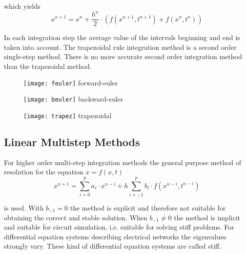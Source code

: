 which yields
\begin{equation}
\label{eq:TRInt}
x^{n+1} = x^n + \dfrac{h^n}{2}\cdot \left(f(x^{n+1}, t^{n+1}) + f(x^{n}, t^{n})\right)
\end{equation}

In each integration step the average value of the intervals beginning
and end is taken into account.  The trapezoidal rule integration
method is a second order single-step method.  There is no more
accurate second order integration method than the trapezoidal method.

\begin{center}
\begin{figure}[ht]
\begin{minipage}[t]{0.33\linewidth}
\centering
\texttt{[image: feuler]}
forward-euler
\end{minipage}
\begin{minipage}[t]{0.33\linewidth}
\centering
\texttt{[image: beuler]}
backward-euler
\end{minipage}
\begin{minipage}[t]{0.33\linewidth}
\centering
\texttt{[image: trapez]}
trapezoidal
\end{minipage}
\end{figure}
\FloatBarrier
\end{center}

\subsection{Linear Multistep Methods}

For higher order multi-step integration methods the general purpose
method of resolution for the equation $\dot{x} = f(x,t)$
\begin{equation}
\label{eq:GenPurposeInt}
x^{n+1} = \sum^p_{i=0} a_i\cdot x^{n-i} + h \sum^p_{i=-1} b_i\cdot f(x^{n-i}, t^{n-i})
\end{equation}

is used.  With $b_{-1} = 0$ the method is explicit and therefore not
suitable for obtaining the correct and stable solution.  When $b_{-1}
\ne 0$ the method is implicit and suitable for circuit simulation,
i.e. suitable for solving stiff problems.  For differential equation
systems describing electrical networks the eigenvalues strongly vary.
These kind of differential equation systems are called stiff.

\addvspace{12pt}

